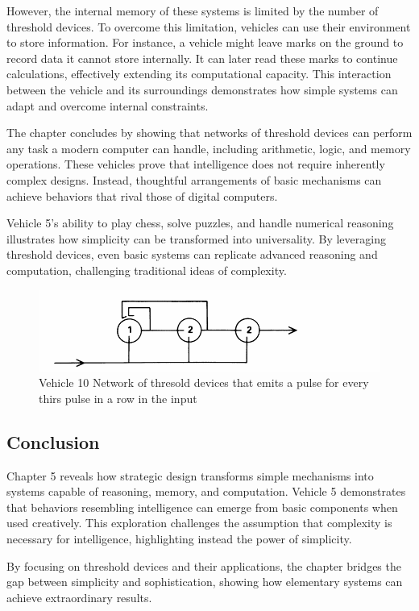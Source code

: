 \documentclass{article}
\begin{document}
    However, the internal memory of these systems is limited by the number of threshold devices. To overcome this limitation, vehicles can use their environment to store information. For instance, a vehicle might leave marks on the ground to record data it cannot store internally. It can later read these marks to continue calculations, effectively extending its computational capacity. This interaction between the vehicle and its surroundings demonstrates how simple systems can adapt and overcome internal constraints. 
	

    The chapter concludes by showing that networks of threshold devices can perform any task a modern computer can handle, including arithmetic, logic, and memory operations. These vehicles prove that intelligence does not require inherently complex designs. Instead, thoughtful arrangements of basic mechanisms can achieve behaviors that rival those of digital computers.  

    Vehicle 5's ability to play chess, solve puzzles, and handle numerical reasoning illustrates how simplicity can be transformed into universality. By leveraging threshold devices, even basic systems can replicate advanced reasoning and computation, challenging traditional ideas of complexity.


	\begin{figure}[h]
		\centering
		\includegraphics[scale=0.6]{images/figure_10b.png}
		\caption{Vehicle 10 Network of thresold devices that emits a pulse for every thirs pulse in a row in the input}
		\label{fig:vehicle-10b}
	\end{figure}

    \subsection*{Conclusion}
    Chapter 5 reveals how strategic design transforms simple mechanisms into systems capable of reasoning, memory, and computation. Vehicle 5 demonstrates that behaviors resembling intelligence can emerge from basic components when used creatively. This exploration challenges the assumption that complexity is necessary for intelligence, highlighting instead the power of simplicity.  

    By focusing on threshold devices and their applications, the chapter bridges the gap between simplicity and sophistication, showing how elementary systems can achieve extraordinary results.
	
\end{document}
